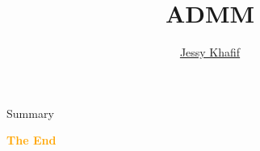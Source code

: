 \documentclass[aspectratio=43]{beamer}
\title{
    ADMM
} %
\author{
    \href{https://github.com/akhaten}{Jessy Khafif}
}
\begin{document}
    
    \frame{\titlepage}
    
    \begin{frame}{Summary}
        \tableofcontents
    \end{frame}
    

    
    
    
    
    

    \begin{frame}{}
        \centering
            \Huge\bfseries
        \textcolor{orange}{The End}
    \end{frame}
\end{document}
